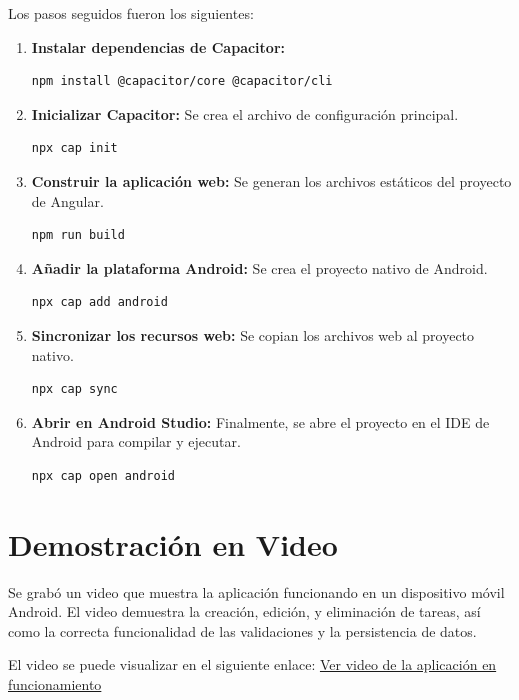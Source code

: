 \documentclass{article}
\begin{document}
Los pasos seguidos fueron los siguientes:
\begin{enumerate}
    \item \textbf{Instalar dependencias de Capacitor:}
    \begin{verbatim}
npm install @capacitor/core @capacitor/cli
    \end{verbatim}

    \item \textbf{Inicializar Capacitor:} Se crea el archivo de configuración principal.
    \begin{verbatim}
npx cap init
    \end{verbatim}

    \item \textbf{Construir la aplicación web:} Se generan los archivos estáticos del proyecto de Angular.
    \begin{verbatim}
npm run build
    \end{verbatim}

    \item \textbf{Añadir la plataforma Android:} Se crea el proyecto nativo de Android.
    \begin{verbatim}
npx cap add android
    \end{verbatim}

    \item \textbf{Sincronizar los recursos web:} Se copian los archivos web al proyecto nativo.
    \begin{verbatim}
npx cap sync
    \end{verbatim}

    \item \textbf{Abrir en Android Studio:} Finalmente, se abre el proyecto en el IDE de Android para compilar y ejecutar.
    \begin{verbatim}
npx cap open android
    \end{verbatim}
\end{enumerate}



\section{Demostración en Video}
Se grabó un video que muestra la aplicación funcionando en un dispositivo móvil Android. El video demuestra la creación, edición, y eliminación de tareas, así como la correcta funcionalidad de las validaciones y la persistencia de datos.

El video se puede visualizar en el siguiente enlace:
\href{https://correobuap-my.sharepoint.com/:v:/g/personal/kirbi_huertas_alumno_buap_mx/ERhO-CAdlztNmy3Wuwh2q4IB6dL--OChuUR7Iv7fA9dB9Q?nav=eyJyZWZlcnJhbEluZm8iOnsicmVmZXJyYWxBcHAiOiJPbmVEcml2ZUZvckJ1c2luZXNzIiwicmVmZXJyYWxBcHBQbGF0Zm9ybSI6IldlYiIsInJlZmVycmFsTW9kZSI6InZpZXciLCJyZWZlcnJhbFZpZXciOiJNeUZpbGVzTGlua0NvcHkifX0&e=i78Fpx}{Ver video de la aplicación en funcionamiento}
\end{document}
